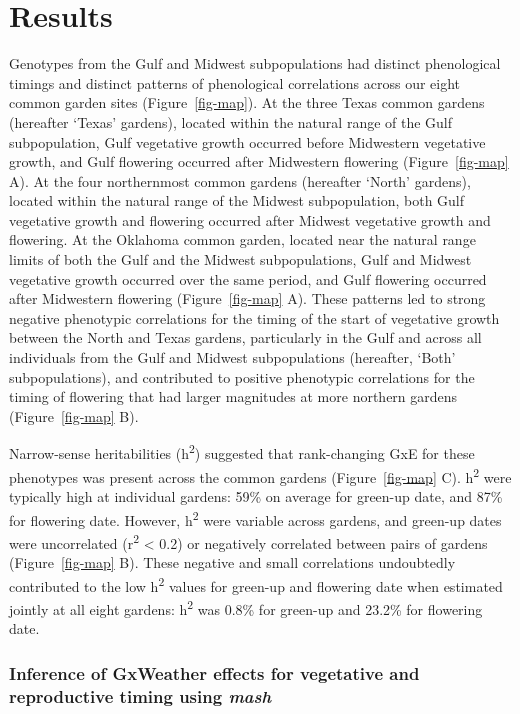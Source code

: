\documentclass[
  9pt,
  twocolumn,
  twoside]{pnas-new}
\begin{document}
\section{Results}\label{results}

Genotypes from the Gulf and Midwest subpopulations had distinct
phenological timings and distinct patterns of phenological correlations
across our eight common garden sites (Figure~\ref{fig-map}). At the
three Texas common gardens (hereafter `Texas' gardens), located within
the natural range of the Gulf subpopulation, Gulf vegetative growth
occurred before Midwestern vegetative growth, and Gulf flowering
occurred after Midwestern flowering (Figure~\ref{fig-map} A). At the
four northernmost common gardens (hereafter `North' gardens), located
within the natural range of the Midwest subpopulation, both Gulf
vegetative growth and flowering occurred after Midwest vegetative growth
and flowering. At the Oklahoma common garden, located near the natural
range limits of both the Gulf and the Midwest subpopulations, Gulf and
Midwest vegetative growth occurred over the same period, and Gulf
flowering occurred after Midwestern flowering (Figure~\ref{fig-map} A).
These patterns led to strong negative phenotypic correlations for the
timing of the start of vegetative growth between the North and Texas
gardens, particularly in the Gulf and across all individuals from the
Gulf and Midwest subpopulations (hereafter, `Both' subpopulations), and
contributed to positive phenotypic correlations for the timing of
flowering that had larger magnitudes at more northern gardens
(Figure~\ref{fig-map} B).

Narrow-sense heritabilities (h\textsuperscript{2}) suggested that
rank-changing GxE for these phenotypes was present across the common
gardens (Figure~\ref{fig-map} C). h\textsuperscript{2} were typically
high at individual gardens: 59\% on average for green-up date, and 87\%
for flowering date. However, h\textsuperscript{2} were variable across
gardens, and green-up dates were uncorrelated (r\textsuperscript{2}
\textless{} 0.2) or negatively correlated between pairs of gardens
(Figure~\ref{fig-map} B). These negative and small correlations
undoubtedly contributed to the low h\textsuperscript{2} values for
green-up and flowering date when estimated jointly at all eight gardens:
h\textsuperscript{2} was 0.8\% for green-up and 23.2\% for flowering
date.

\subsubsection{\texorpdfstring{Inference of GxWeather effects for
vegetative and reproductive timing using
\emph{mash}}{Inference of GxWeather effects for vegetative and reproductive timing using mash}}\label{inference-of-gxweather-effects-for-vegetative-and-reproductive-timing-using-mash}
\end{document}
